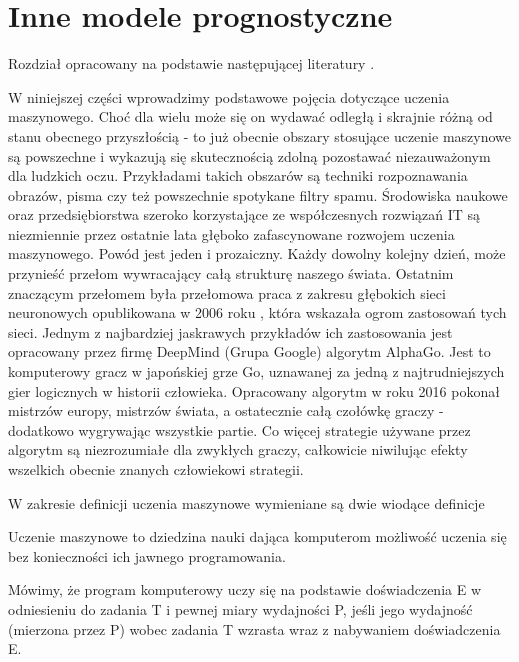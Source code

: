 \documentclass[10pt,a4paper]{book}
\begin{document}
\chapter{Inne modele prognostyczne}

Rozdział opracowany na podstawie następującej literatury \citep{geron2018uczenie}.

W niniejszej części wprowadzimy podstawowe pojęcia dotyczące uczenia maszynowego. Choć dla wielu może się on wydawać odległą i skrajnie różną od stanu obecnego przyszłością - to już obecnie obszary stosujące uczenie maszynowe są powszechne i wykazują się skutecznością zdolną pozostawać niezauważonym dla ludzkich oczu. Przykładami takich obszarów są techniki rozpoznawania obrazów, pisma czy też powszechnie spotykane filtry spamu. Środowiska naukowe oraz przedsiębiorstwa szeroko korzystające ze współczesnych rozwiązań IT są niezmiennie przez ostatnie lata głęboko zafascynowane rozwojem uczenia maszynowego. Powód jest jeden i prozaiczny. Każdy dowolny kolejny dzień, może przynieść przełom wywracający całą strukturę naszego świata. Ostatnim znaczącym przełomem była przełomowa praca z zakresu głębokich sieci neuronowych opublikowana w 2006 roku \cite{hinton2006fast}, która wskazała ogrom zastosowań tych sieci. Jednym z najbardziej jaskrawych przykładów ich zastosowania jest opracowany przez firmę DeepMind (Grupa Google) algorytm AlphaGo. Jest to komputerowy gracz w japońskiej grze Go, uznawanej za jedną z najtrudniejszych gier logicznych w historii człowieka. Opracowany algorytm w roku 2016 pokonał mistrzów europy, mistrzów świata, a ostatecznie całą czołówkę graczy - dodatkowo wygrywając wszystkie partie. Co więcej strategie używane przez algorytm są niezrozumiałe dla zwykłych graczy, całkowicie niwilując efekty wszelkich obecnie znanych człowiekowi strategii. 

W zakresie definicji uczenia maszynowe wymieniane są dwie wiodące definicje

\begin{definition}
Uczenie maszynowe to dziedzina nauki dająca komputerom możliwość uczenia się bez konieczności ich jawnego programowania. 
\end{definition}

\begin{definition}
Mówimy, że program komputerowy uczy się na podstawie doświadczenia E w odniesieniu do zadania T i pewnej miary wydajności P, jeśli jego wydajność (mierzona przez P) wobec zadania T wzrasta wraz z nabywaniem doświadczenia E.
\end{definition}
\end{document}
